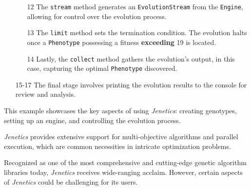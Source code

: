 \begin{enumerate}
\begin{enumerate}
        \item[12] The \texttt{stream} method generates an 
          \texttt{EvolutionStream} from the \texttt{Engine}, allowing for 
          control over the evolution process.
        \item[13] The \texttt{limit} method sets the termination condition.
          The evolution halts once a \texttt{Phenotype} possessing a fitness 
          \textbf{exceeding} 19 is located.
        \item[14] Lastly, the \texttt{collect} method gathers the evolution's 
          output, in this case, capturing the optimal \texttt{Phenotype} 
          discovered.
      \end{enumerate}
    \item[15-17] The final stage involves printing the evolution results to the 
      console for review and analysis.
  \end{enumerate}

  This example showcases the key aspects of using \textit{Jenetics}: creating 
  genotypes, setting up an engine, and controlling the evolution process.

  \textit{Jenetics} provides extensive support for multi-objective algorithms 
  and parallel execution, which are common necessities in intricate optimization
  problems.

  Recognized as one of the most comprehensive and cutting-edge genetic algorithm libraries today, \textit{Jenetics} receives wide-ranging acclaim. However, certain aspects of \textit{Jenetics} could be challenging for its users.

